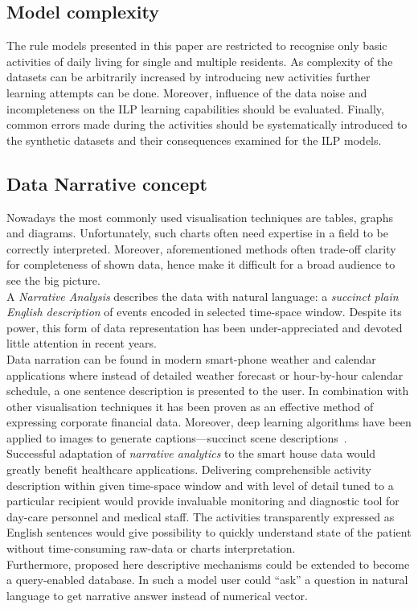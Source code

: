 \documentclass[10pt, a4paper, pdflatex, leqno, twoside, openright]{report}
\begin{document}
    \subsection{Model complexity}
The rule models presented in this paper are restricted to recognise only basic activities of daily living for single and multiple residents. As complexity of the datasets can be arbitrarily increased by introducing new activities further learning attempts can be done. Moreover, influence of the data noise and incompleteness on the ILP learning capabilities should be evaluated. Finally, common errors made during the activities should be systematically introduced to the synthetic datasets and their consequences examined for the ILP models.

    \subsection{Data Narrative concept\label{sec:narrative}}
Nowadays the most commonly used visualisation techniques are tables, graphs and diagrams. Unfortunately, such charts often need expertise in a field to be correctly interpreted. Moreover, aforementioned methods often trade-off clarity for completeness of shown data, hence make it difficult for a broad audience to see the big picture.\\

A \emph{Narrative Analysis} describes the data with natural language: a \emph{succinct plain English description} of events encoded in selected time-space window. Despite its power, this form of data representation has been under-appreciated and devoted little attention in recent years.\\
Data narration can be found in modern smart-phone weather and calendar applications where instead of detailed weather forecast or hour-by-hour calendar schedule, a one sentence description is presented to the user. In combination with other visualisation techniques it has been proven as an effective method of expressing corporate financial data. Moreover, deep learning algorithms have been applied to images to generate captions---succinct scene descriptions~\citep{vinyals2014show}.\\

Successful adaptation of \emph{narrative analytics} to the smart house data would greatly benefit healthcare applications. Delivering comprehensible activity description within given time-space window and with level of detail tuned to a particular recipient would provide invaluable monitoring and diagnostic tool for day-care personnel and medical staff. The activities transparently expressed as English sentences would give possibility to quickly understand state of the patient without time-consuming raw-data or charts interpretation.\\
Furthermore, proposed here descriptive mechanisms could be extended to become a query-enabled database. In such a model user could ``ask'' a question in natural language to get narrative answer instead of numerical vector.\\
\end{document}
